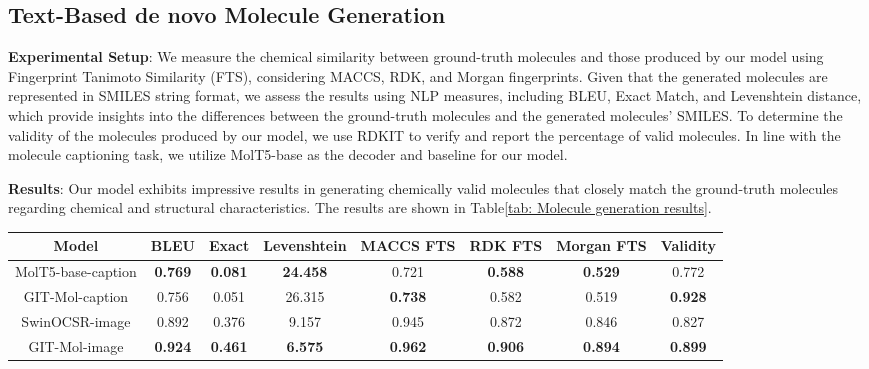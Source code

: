 \documentclass{article}
\begin{document}
\subsection{Text-Based de novo Molecule Generation}
\textbf{Experimental Setup}: We measure the chemical similarity between ground-truth molecules and those produced by our model using Fingerprint Tanimoto Similarity (FTS), considering MACCS, RDK, and Morgan fingerprints. Given that the generated molecules are represented in SMILES string format, we assess the results using NLP measures, including BLEU, Exact Match, and Levenshtein distance, which provide insights into the differences between the ground-truth molecules and the generated molecules' SMILES. To determine the validity of the molecules produced by our model, we use RDKIT to verify and report the percentage of valid molecules. In line with the molecule captioning task, we utilize MolT5-base as the decoder and baseline for our model.
 
\textbf{Results}: Our model exhibits impressive results in generating chemically valid molecules that closely match the ground-truth molecules regarding chemical and structural characteristics. The results are shown in Table\ref{tab: Molecule generation results}.
 \begin{table*}[htbp]
	\centering
    \caption{\textbf{Molecule generation results}. Our model performs similarly to MolT5-base regarding metrics for generating SMILES molecules but excels in ensuring molecule validity. With a molecule validity of \textbf{92.8\%}, our model surpasses MolT5-base's validity of 77.2\% by over \textbf{20\%}. It also outperforms MolT5-large's molecule validity of \textbf{90.5\%}.}
    \label{tab: Molecule generation results}
	\begin{tabular}{c|c|c|c|c|c|c|c}
	\hline
	\textbf{Model} & \textbf{BLEU} & \textbf{Exact} & \textbf{Levenshtein} & \textbf{MACCS FTS} & \textbf{RDK FTS} & \textbf{Morgan FTS} & \textbf{Validity}\\
		\hline
		MolT5-base-caption & \textbf{0.769} & \textbf{0.081} & \textbf{24.458} & 0.721 & \textbf{0.588} & \textbf{0.529} & 0.772\\	\hline
		GIT-Mol-caption & 0.756  & 0.051 & 26.315 & \textbf{0.738} & 0.582 & 0.519 & \textbf{0.928}\\
		\hline
		SwinOCSR-image & 0.892 & 0.376 & 9.157 & 0.945 & 0.872 & 0.846 & 0.827\\	\hline
		GIT-Mol-image & \textbf{0.924} & \textbf{0.461} & \textbf{6.575} & \textbf{0.962} & \textbf{0.906} & \textbf{0.894} & \textbf{0.899}\\
		\hline
	\end{tabular}
\end{table*}
\end{document}

